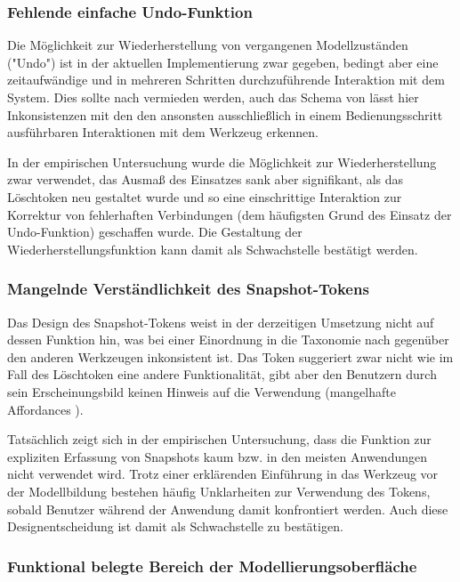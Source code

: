 \subsubsection{Fehlende einfache Undo-Funktion}

Die Möglichkeit zur Wiederherstellung von vergangenen Modellzuständen ("Undo") ist in der aktuellen Implementierung zwar gegeben, bedingt aber eine zeitaufwändige und in mehreren Schritten durchzuführende Interaktion mit dem System. Dies sollte nach \citet{Bellotti02} vermieden werden, auch das Schema von \citet{Shaer04} lässt hier Inkonsistenzen mit den den ansonsten ausschließlich in einem Bedienungsschritt ausführbaren Interaktionen mit dem Werkzeug erkennen.

In der empirischen Untersuchung wurde die Möglichkeit zur Wiederherstellung zwar verwendet, das Ausmaß des Einsatzes sank aber signifikant, als das Löschtoken neu gestaltet wurde und so eine einschrittige Interaktion zur Korrektur von fehlerhaften Verbindungen (dem häufigsten Grund des Einsatz der Undo-Funktion) geschaffen wurde. Die Gestaltung der Wiederherstellungsfunktion kann damit als Schwachstelle bestätigt werden.

\subsubsection{Mangelnde Verständlichkeit des Snapshot-Tokens}

Das Design des Snapshot-Tokens weist in der derzeitigen Umsetzung nicht auf dessen Funktion hin, was bei einer Einordnung in die Taxonomie nach \citet{Fishkin04} gegenüber den anderen Werkzeugen inkonsistent ist. Das Token suggeriert zwar nicht wie im Fall des Löschtoken eine andere Funktionalität, gibt aber den Benutzern durch sein Erscheinungsbild keinen Hinweis auf die Verwendung (mangelhafte Affordances \citep{Norman90}).

Tatsächlich zeigt sich in der empirischen Untersuchung, dass die Funktion zur expliziten Erfassung von Snapshots kaum bzw. in den meisten Anwendungen nicht verwendet wird. Trotz einer erklärenden Einführung in das Werkzeug vor der Modellbildung bestehen häufig Unklarheiten zur Verwendung des Tokens, sobald Benutzer während der Anwendung damit konfrontiert werden. Auch diese Designentscheidung ist damit als Schwachstelle zu bestätigen. 

\subsubsection{Funktional belegte Bereich der Modellierungsoberfläche}

